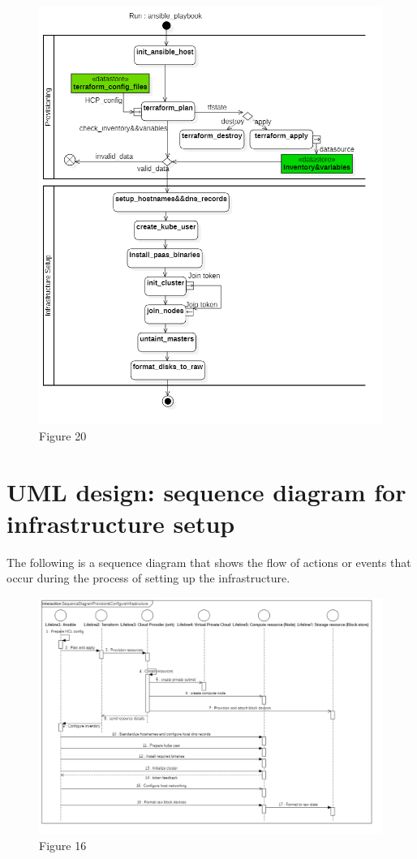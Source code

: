 \begin{figure}[H]\centering
\includegraphics[width=1.0\textwidth,angle=00]{assets/f20.png}
\caption{Figure 20}
\label{fig:fig20}
\end{figure}


\section{UML design: sequence diagram for infrastructure setup}

The following is a sequence diagram that shows the flow of actions or events that occur during the process of setting up the infrastructure.


\begin{figure}[H]\centering
\includegraphics[width=1.0\textwidth,angle=00]{assets/f16.png}
\caption{Figure 16}
\label{fig:fig16}
\end{figure}

